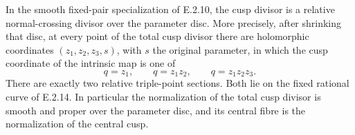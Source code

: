 \begin{proposition}
In the smooth fixed-pair specialization of E.2.10,
the cusp divisor is a relative normal-crossing divisor
over the parameter disc.  More precisely, after
shrinking that disc, at every point of the total cusp
divisor there are holomorphic coordinates
$(z_1,z_2,z_3,s)$, with $s$ the original parameter,
in which the cusp coordinate of the intrinsic map is
one of
\[
 q=z_1,\qquad q=z_1z_2,\qquad q=z_1z_2z_3.
 \tag{E.2.17.1}
\]
There are exactly two relative triple-point sections.
Both lie on the fixed rational curve of E.2.14.
In particular the normalization of the total cusp
divisor is smooth and proper over the parameter
disc, and its central fibre is the normalization
of the central cusp.
\end{proposition}
